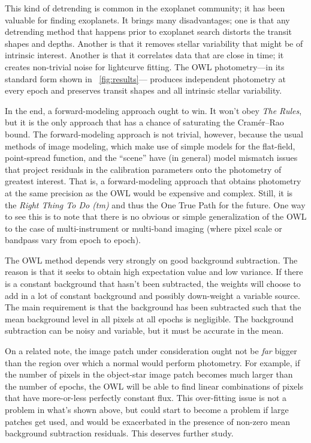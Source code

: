 \documentclass[12pt, letterpaper, preprint]{aastex}
\begin{document}
This kind of detrending is common in the exoplanet community;
  it has been valuable for finding exoplanets.
It brings many disadvantages;
  one is that any detrending method that happens prior to exoplanet search
  distorts the transit shapes and depths.
Another is that it removes stellar variability that might be of intrinsic interest.
Another is that it correlates data that are close in time;
  it creates non-trivial noise for lightcurve fitting.
The OWL photometry---in its standard form shown in \figurename~\ref{fig:results}---%
  produces independent photometry at every epoch
  and preserves transit shapes and all intrinsic stellar variability.

In the end, a forward-modeling approach ought to win.
It won't obey \emph{The Rules}, but it is the only approach that has a chance
  of saturating the Cram\'er--Rao bound.
The forward-modeling approach is not trivial, however,
  because the usual methods of image modeling,
  which make use of simple models for the flat-field, point-spread function,
  and the ``scene''
  have (in general) model mismatch issues that project residuals
  in the calibration parameters onto the photometry of greatest interest.
That is, a forward-modeling approach that obtains photometry at the same
  precision as the OWL would be expensive and complex.
Still, it is the \emph{Right Thing To Do (tm)} and thus the One True Path for the future.
One way to see this is to note that there is no obvious or simple generalization of the OWL
  to the case of multi-instrument or multi-band imaging
  (where pixel scale or bandpass vary from epoch to epoch).

The OWL method depends very strongly on good background subtraction.
The reason is that it seeks to obtain high expectation value and low variance.
If there is a constant background that hasn't been subtracted,
  the weights will choose to add in a lot of constant background
  and possibly down-weight a variable source.
The main requirement is that the background has been subtracted such
  that the mean background level in all pixels at all epochs is negligible.
The background subtraction can be noisy and variable,
  but it must be accurate in the mean.

On a related note, the image patch under consideration ought not be \emph{far}
  bigger than the region over which a normal would perform photometry.
For example, if the number of pixels in the object-star image patch becomes
  much larger than the number of epochs,
  the OWL will be able to find linear combinations of pixels that have
  more-or-less perfectly constant flux.
This over-fitting issue is not a problem in what's shown above,
  but could start to become a problem if large patches get used,
  and would be exacerbated in the presence of non-zero mean background subtraction residuals.
This deserves further study.
\end{document}
